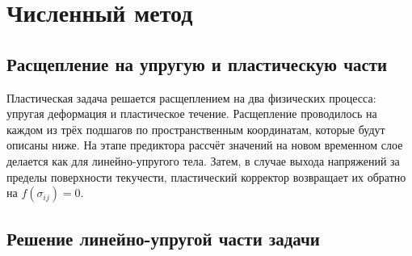 \section{Численный метод}
\subsection{Расщепление на упругую и пластическую части}
Пластическая задача решается расщеплением на два физических процесса: упругая деформация и пластическое течение. Расщепление проводилось на каждом из трёх подшагов по пространственным координатам, которые будут описаны ниже. На этапе предиктора рассчёт значений на новом временном слое делается как для линейно-упругого тела. Затем, в случае выхода напряжений за пределы поверхности текучести, пластический корректор возвращает их обратно на $f(\sigma_{ij})=0$.
\subsection{Решение линейно-упругой части задачи}
